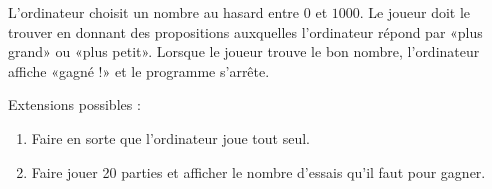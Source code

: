 
\begin{exercice}\label{exosmath-0580}

    L'ordinateur choisit un nombre au hasard entre \( 0\) et \( 1000\). Le joueur doit le trouver en donnant des propositions auxquelles l'ordinateur répond par «plus grand» ou «plus petit». Lorsque le joueur trouve le bon nombre, l'ordinateur affiche «gagné !» et le programme s'arrête.

    Extensions possibles :
    \begin{enumerate}
        \item
            Faire en sorte que l'ordinateur joue tout seul.
        \item
            Faire jouer 20 parties et afficher le nombre d'essais qu'il faut pour gagner.
    \end{enumerate}

\end{exercice}
